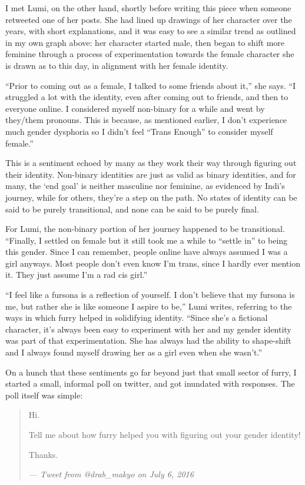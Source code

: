 I met Lumi, on the other hand, shortly before writing this piece when someone retweeted one of her posts.  She had lined up drawings of her character over the years, with short explanations, and it was easy to see a similar trend as outlined in my own graph above: her character started male, then began to shift more feminine through a process of experimentation towards the female character she is drawn as to this day, in alignment with her female identity.

``Prior to coming out as a female, I talked to some friends about it,'' she says.  ``I struggled a lot with the identity, even after coming out to friends, and then to everyone online. I considered myself non-binary for a while and went by they/them pronouns. This is because, as mentioned earlier, I don’t experience much gender dysphoria so I didn’t feel “Trans Enough” to consider myself female.''

This is a sentiment echoed by many as they work their way through figuring out their identity.  Non-binary identities are just as valid as binary identities, and for many, the `end goal' is neither masculine nor feminine, as evidenced by Indi's journey, while for others, they're a step on the path.  No states of identity can be said to be purely transitional, and none can be said to be purely final.

For Lumi, the non-binary portion of her journey happened to be transitional.  ``Finally, I settled on female but it still took me a while to “settle in” to being this gender. Since I can remember, people online have always assumed I was a girl anyways.  Most people don’t even know I’m trans, since I hardly ever mention it. They just assume I’m a rad cis girl.''

``I feel like a fursona is a reflection of yourself. I don’t believe that my fursona is me, but rather she is like someone I aspire to be,'' Lumi writes, referring to the ways in which furry helped in solidifying identity.  ``Since she’s a fictional character, it’s always been easy to experiment with her and my gender identity was part of that experimentation. She has always had the ability to shape-shift and I always found myself drawing her as a girl even when she wasn’t.''

\secdiv

On a hunch that these sentiments go far beyond just that small sector of furry, I started a small, informal poll on twitter, and got inundated with responses.  The poll itself was simple:

\begin{quotation}
  Hi.

  Tell me about how furry helped you with figuring out your gender identity!

  Thanks.

  \textit{--- Tweet from @drab\_makyo on July 6, 2016}
\end{quotation}


